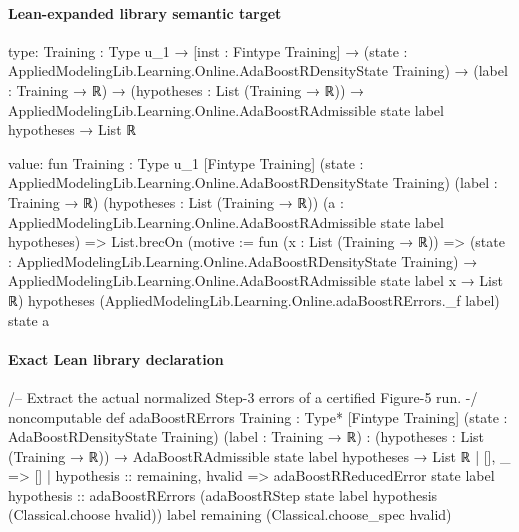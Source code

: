 \documentclass[10pt]{article}
\begin{document}
\paragraph{Lean-expanded library semantic target}
\begin{ReviewVerbatim}
type:
{Training : Type u_1} →
  [inst : Fintype Training] →
    (state : AppliedModelingLib.Learning.Online.AdaBoostRDensityState Training) →
      (label : Training → ℝ) →
        (hypotheses : List (Training → ℝ)) →
          AppliedModelingLib.Learning.Online.AdaBoostRAdmissible state label hypotheses → List ℝ

value:
fun {Training : Type u_1} [Fintype Training] (state : AppliedModelingLib.Learning.Online.AdaBoostRDensityState Training)
    (label : Training → ℝ) (hypotheses : List (Training → ℝ))
    (a : AppliedModelingLib.Learning.Online.AdaBoostRAdmissible state label hypotheses) =>
  List.brecOn (motive := fun (x : List (Training → ℝ)) =>
    (state : AppliedModelingLib.Learning.Online.AdaBoostRDensityState Training) →
      AppliedModelingLib.Learning.Online.AdaBoostRAdmissible state label x → List ℝ)
    hypotheses (AppliedModelingLib.Learning.Online.adaBoostRErrors._f label) state a
\end{ReviewVerbatim}

\paragraph{Exact Lean library declaration}
\begin{ReviewVerbatim}
/-- Extract the actual normalized Step-3 errors of a certified Figure-5 run. -/
noncomputable def adaBoostRErrors
    {Training : Type*} [Fintype Training]
    (state : AdaBoostRDensityState Training) (label : Training → ℝ) :
    (hypotheses : List (Training → ℝ)) →
      AdaBoostRAdmissible state label hypotheses → List ℝ
  | [], _ => []
  | hypothesis :: remaining, hvalid =>
      adaBoostRReducedError state label hypothesis ::
        adaBoostRErrors
          (adaBoostRStep state label hypothesis (Classical.choose hvalid)) label remaining
          (Classical.choose_spec hvalid)
\end{ReviewVerbatim}
\end{document}
